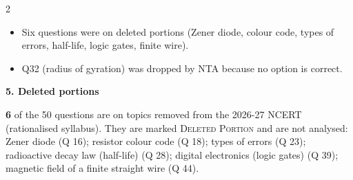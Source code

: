 \begin{multicols}{2}
{\begin{itemize}[leftmargin=1em,nosep]
\item Six questions were on deleted portions (Zener diode, colour code, types of errors, half-life, logic gates, finite wire).
\item Q32 (radius of gyration) was dropped by NTA because no option is correct.
\end{itemize}}\par\medskip
\textbf{\color{crimson}5. Deleted portions}\par\smallskip
\textbf{6} of the 50 questions are on topics removed from the 2026-27 NCERT (rationalised syllabus). They are marked \textsc{Deleted Portion} and are not analysed: Zener diode (Q 16); resistor colour code (Q 18); types of errors (Q 23); radioactive decay law (half-life) (Q 28); digital electronics (logic gates) (Q 39); magnetic field of a finite straight wire (Q 44).\par
\end{multicols}


